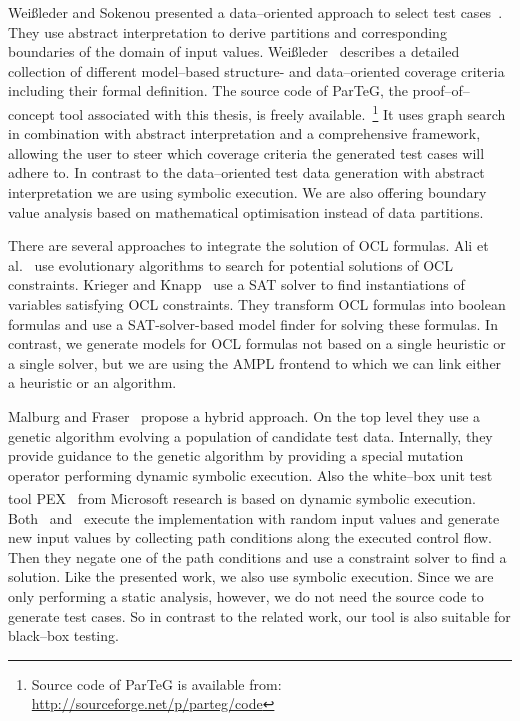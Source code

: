 \documentclass[runningheads,a4paper]{llncs}%
\begin{document}
Wei{\ss}leder and Sokenou presented a data--oriented approach to select test
cases~\cite{weissleder2008automatic}. They use abstract interpretation to derive
partitions and corresponding boundaries of the domain of input values.
Wei{\ss}leder~\cite{ParTeG} describes a detailed collection of different
model--based structure- and data--oriented coverage criteria including their
formal definition. The source code of ParTeG, the proof--of--concept tool
associated with this thesis, is freely available.~\footnote{Source code of
ParTeG is available from:
\href{http://sourceforge.net/p/parteg/code}{http://sourceforge.net/p/parteg/code}}
It uses graph search in combination with abstract interpretation and a
comprehensive framework, allowing the user to steer which coverage criteria the
generated test cases will adhere to. In contrast to the data--oriented test data
generation with abstract interpretation we are using symbolic execution. We are
also offering boundary value analysis based on mathematical optimisation instead
of data partitions.

There are several approaches to integrate the solution of OCL formulas. Ali et
al.~\cite{ali2011search} use evolutionary algorithms to search for potential
solutions of OCL constraints. Krieger and
Knapp~\cite{krieger2008executingUnderspecifiedOCL} use a SAT solver to find
instantiations of variables satisfying OCL constraints. They transform OCL
formulas into boolean formulas and use a SAT-solver-based model finder for
solving these formulas. In contrast, we generate models for OCL formulas not
based on a single heuristic or a single solver, but we are using the AMPL
frontend to which we can link either a heuristic or an algorithm.

Malburg and Fraser~\cite{malburg2011combining} propose a hybrid approach. On the
top level they use a genetic algorithm evolving a population of candidate test
data. Internally, they provide guidance to the genetic algorithm by providing a
special mutation operator performing dynamic symbolic execution. Also the
white--box unit test tool PEX~\cite{pex} from
Microsoft\textsuperscript{\textregistered} research is based on dynamic symbolic
execution. Both~\cite{malburg2011combining} and~\cite{pex} execute the
implementation with random input values and generate new input values by
collecting path conditions along the executed control flow. Then they negate one
of the path conditions and use a constraint solver to find a solution. Like the
presented work, we also use symbolic execution. Since we are only performing a
static analysis, however, we do not need the source code to generate test cases.
So in contrast to the related work, our tool is also suitable for black--box
testing.
%
\end{document}
